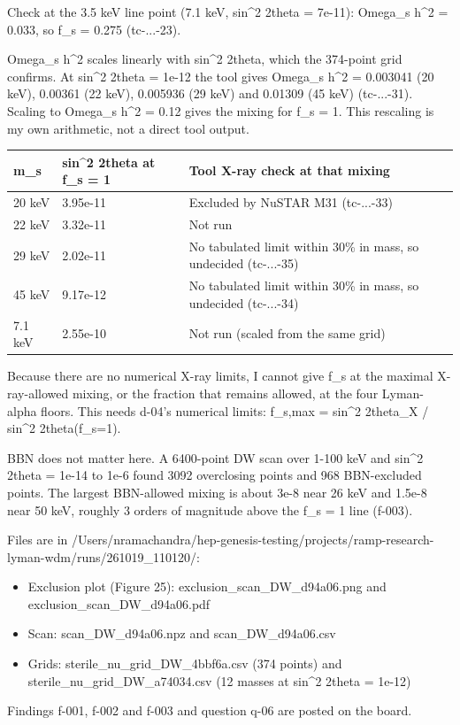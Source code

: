 \documentclass[11pt,a4paper]{article}
\begin{document}
Check at the 3.5 keV line point (7.1 keV, sin\textasciicircum{}2 2theta = 7e-11): Omega\_s h\textasciicircum{}2 = 0.033, so f\_s = 0.275 (tc-...-23).

Omega\_s h\textasciicircum{}2 scales linearly with sin\textasciicircum{}2 2theta, which the 374-point grid confirms. At sin\textasciicircum{}2 2theta = 1e-12 the tool gives Omega\_s h\textasciicircum{}2 = 0.003041 (20 keV), 0.00361 (22 keV), 0.005936 (29 keV) and 0.01309 (45 keV) (tc-...-31). Scaling to Omega\_s h\textasciicircum{}2 = 0.12 gives the mixing for f\_s = 1. This rescaling is my own arithmetic, not a direct tool output.

\begin{longtable}{@{}p{}p{}p{}@{}}
\toprule
\textbf{m\_s} & \textbf{sin\textasciicircum{}2 2theta at f\_s = 1} & \textbf{Tool X-ray check at that mixing} \\ \midrule \endhead
20 keV & 3.95e-11 & Excluded by NuSTAR M31 (tc-...-33) \\
22 keV & 3.32e-11 & Not run \\
29 keV & 2.02e-11 & No tabulated limit within 30\% in mass, so undecided (tc-...-35) \\
45 keV & 9.17e-12 & No tabulated limit within 30\% in mass, so undecided (tc-...-34) \\
7.1 keV & 2.55e-10 & Not run (scaled from the same grid) \\
\bottomrule\end{longtable}
Because there are no numerical X-ray limits, I cannot give f\_s at the maximal X-ray-allowed mixing, or the fraction that remains allowed, at the four Lyman-alpha floors. This needs d-04's numerical limits: f\_s,max = sin\textasciicircum{}2 2theta\_X / sin\textasciicircum{}2 2theta(f\_s=1).

BBN does not matter here. A 6400-point DW scan over 1-100 keV and sin\textasciicircum{}2 2theta = 1e-14 to 1e-6 found 3092 overclosing points and 968 BBN-excluded points. The largest BBN-allowed mixing is about 3e-8 near 26 keV and 1.5e-8 near 50 keV, roughly 3 orders of magnitude above the f\_s = 1 line (f-003).

Files are in /Users/nramachandra/hep-genesis-testing/projects/ramp-research-lyman-wdm/runs/261019\_110120/:

\begin{itemize}
  \item Exclusion plot (Figure 25): exclusion\_scan\_DW\_d94a06.png and exclusion\_scan\_DW\_d94a06.pdf
  \item Scan: scan\_DW\_d94a06.npz and scan\_DW\_d94a06.csv
  \item Grids: sterile\_nu\_grid\_DW\_4bbf6a.csv (374 points) and sterile\_nu\_grid\_DW\_a74034.csv (12 masses at sin\textasciicircum{}2 2theta = 1e-12)
\end{itemize}
Findings f-001, f-002 and f-003 and question q-06 are posted on the board.
\end{document}
